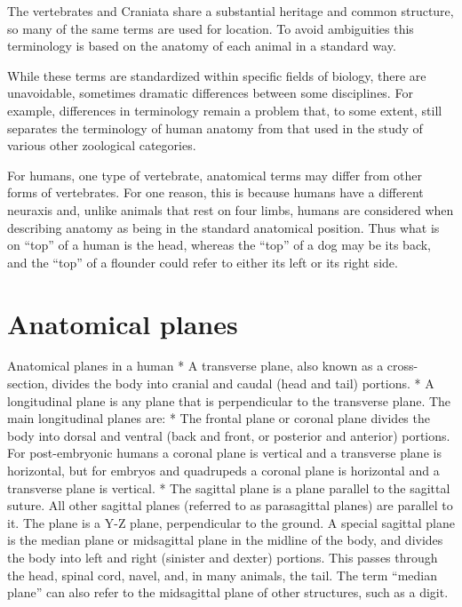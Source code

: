 \documentclass[]{book}
\begin{document}
The vertebrates and Craniata share a substantial heritage and common structure, so many of the same terms are used for location. To avoid ambiguities this terminology is based on the anatomy of each animal in a standard way.

While these terms are standardized within specific fields of biology, there are unavoidable, sometimes dramatic differences between some disciplines. For example, differences in terminology remain a problem that, to some extent, still separates the terminology of human anatomy from that used in the study of various other zoological categories.

For humans, one type of vertebrate, anatomical terms may differ from other forms of vertebrates. For one reason, this is because humans have a different neuraxis and, unlike animals that rest on four limbs, humans are considered when describing anatomy as being in the standard anatomical position. Thus what is on ``top'' of a human is the head, whereas the ``top'' of a dog may be its back, and the ``top'' of a flounder could refer to either its left or its right side.

\hypertarget{anatomical-planes}{%
\section{Anatomical planes}\label{anatomical-planes}}

Anatomical planes in a human
* A transverse plane, also known as a cross-section, divides the body into cranial and caudal (head and tail) portions.
* A longitudinal plane is any plane that is perpendicular to the transverse plane. The main longitudinal planes are:
* The frontal plane or coronal plane divides the body into dorsal and ventral (back and front, or posterior and anterior) portions. For post-embryonic humans a coronal plane is vertical and a transverse plane is horizontal, but for embryos and quadrupeds a coronal plane is horizontal and a transverse plane is vertical.
* The sagittal plane is a plane parallel to the sagittal suture. All other sagittal planes (referred to as parasagittal planes) are parallel to it. The plane is a Y-Z plane, perpendicular to the ground.
A special sagittal plane is the median plane or midsagittal plane in the midline of the body, and divides the body into left and right (sinister and dexter) portions. This passes through the head, spinal cord, navel, and, in many animals, the tail. The term ``median plane'' can also refer to the midsagittal plane of other structures, such as a digit.
\end{document}
